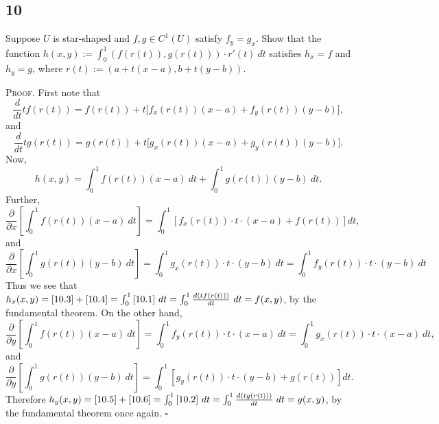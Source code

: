 \documentclass[12pt]{article}
\newcounter{ProofCounter}
\newenvironment{Proof}{\stepcounter{ProofCounter}\textsc{Proof.}}{\hfill$\square$}
\begin{document}
\newpage
\subsection*{10}
\begin{tcolorbox}
Suppose $U$ is star-shaped and $f,g \in C^{1}(U)$ satisfy $f_{y} = g_{x}$. Show that the function $h(x,y) := \int_{0}^{1}(f(r(t)),g(r(t)))\cdot
r'(t)\ dt$ satisfies $h_{x} = f$ and $h_{y} = g$, where $r(t) := (a + t(x-a), b + t(y-b))$.
\end{tcolorbox}


\begin{Proof}
First note that 
\begin{equation}
\frac{d}{dt}t f(r(t)) = f(r(t)) + t\big[ f_{x}(r(t))(x-a) + f_{y}(r(t))(y-b)\big],
\label{10.1}
\end{equation}
and 
\begin{equation}
\frac{d}{dt}t g(r(t)) = g(r(t)) + t\big[ g_{x}(r(t))(x-a) + g_{y}(r(t))(y-b)\big].
\label{10.2}
\end{equation}
Now,
\[ h(x,y) = \int_{0}^{1} f(r(t))(x-a)\ dt + \int_{0}^{1} g(r(t))(y-b)\ dt. \]
Further, 
\begin{equation}
\frac{\partial}{\partial x}\left[ \int_{0}^{1}f(r(t))(x-a)\ dt \right] = \int_{0}^{1}\left[ f_{x}(r(t))\cdot t \cdot (x-a) + f(r(t)) \right]dt,
\label{10.3}
\end{equation}
and 
\begin{equation}
\frac{\partial}{\partial x} \left[ \int_{0}^{1}g(r(t))(y-b)\ dt \right] = \int_{0}^{1} g_{x}(r(t))\cdot t \cdot (y-b)\ dt = \int_{0}^{1}
f_{y}(r(t))\cdot t \cdot (y-b)\ dt
\label{10.4}
\end{equation}
Thus we see that $h_{x}(x,y) = \eqref{10.3} + \eqref{10.4} = \int_{0}^{1} \eqref{10.1}\ dt = \int_{0}^{1} \frac{d( t f(r(t)))}{dt}\ dt = f(x,y)$, by the
fundamental theorem. On the other hand,
\begin{equation}
\frac{\partial}{\partial y}\left[ \int_{0}^{1}f(r(t))(x-a)\ dt \right] = \int_{0}^{1}f_{y}(r(t))\cdot t \cdot (x-a)\ dt = \int_{0}^{1}g_{x}(r(t))\cdot
t \cdot (x-a)\ dt,
\label{10.5}
\end{equation}
and 
\begin{equation}
\frac{\partial}{\partial y}\left[ \int_{0}^{1}g(r(t))(y-b)\ dt \right] = \int_{0}^{1}\left[ g_{y}(r(t))\cdot t \cdot (y-b) + g(r(t)) \right]dt.
\label{10.6}
\end{equation}
Therefore $h_{y}(x,y) = \eqref{10.5} + \eqref{10.6} = \int_{0}^{1} \eqref{10.2}\ dt = \int_{0}^{1}\frac{d(t g(r(t)))}{dt}\ dt = g(x,y)$, by the
fundamental theorem once again.
\end{Proof}
\end{document}
